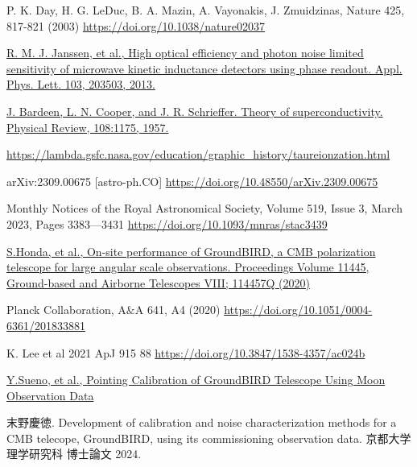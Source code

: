 \begin{thebibliography}{99}
P. K. Day, H. G. LeDuc, B. A. Mazin, A. Vayonakis, J. Zmuidzinas, Nature 425,
817-821 (2003)
\href{https://doi.org/10.1038/nature02037}{https://doi.org/10.1038/nature02037}

\href{https://pubs.aip.org/aip/apl/article-abstract/103/20/203503/130528/High-optical-efficiency-and-photon-noise-limited?redirectedFrom=fulltext}{R. M. J. Janssen, et al., High optical efficiency and photon noise limited sensitivity of microwave kinetic inductance detectors using phase readout. Appl. Phys. Lett. 103, 203503, 2013.}

\href{https://journals.aps.org/pr/abstract/10.1103/PhysRev.108.1175}
{J. Bardeen, L. N. Cooper, and J. R. Schrieffer. Theory of superconductivity. Physical Review, 108:1175, 1957.}

\href{https://lambda.gsfc.nasa.gov/education/graphic\_history/taureionzation.html}{https://lambda.gsfc.nasa.gov/education/graphic\_history/taureionzation.html}

arXiv:2309.00675 [astro-ph.CO]
\href{https://doi.org/10.48550/arXiv.2309.00675}{https://doi.org/10.48550/arXiv.2309.00675}

Monthly Notices of the Royal Astronomical Society, Volume 519, Issue 3, March 2023, Pages 3383—3431
\href{https://doi.org/10.1093/mnras/stac3439}{https://doi.org/10.1093/mnras/stac3439}

\href{https://www.spiedigitallibrary.org/conference-proceedings-of-spie/11445/114457Q/On-site-performance-of-GroundBIRD-a-CMB-polarization-telescope-for/10.1117/12.2560918.short}
{S.Honda, et al., On-site performance of GroundBIRD, a CMB polarization telescope for large angular scale observations. Proceedings Volume 11445, Ground-based and Airborne Telescopes VIII; 114457Q (2020)}

Planck Collaboration, A$\&$A 641, A4 (2020)
\href{https://doi.org/10.1051/0004-6361/201833881}{https://doi.org/10.1051/0004-6361/201833881}

K. Lee et al 2021 ApJ 915 88
\href{https://doi.org/10.3847/1538-4357/ac024b}{https://doi.org/10.3847/1538-4357/ac024b}

\href{https://ui.adsabs.harvard.edu/abs/2024PTEP.2024b3F01S/abstract}
{Y.Sueno, et al., Pointing Calibration of GroundBIRD Telescope Using Moon Observation Data}

末野慶徳. Development of calibration and noise characterization methods for a CMB telecope, GroundBIRD, using its commissioning observation data. 京都大学理学研究科 博士論文 2024.


\end{thebibliography}
